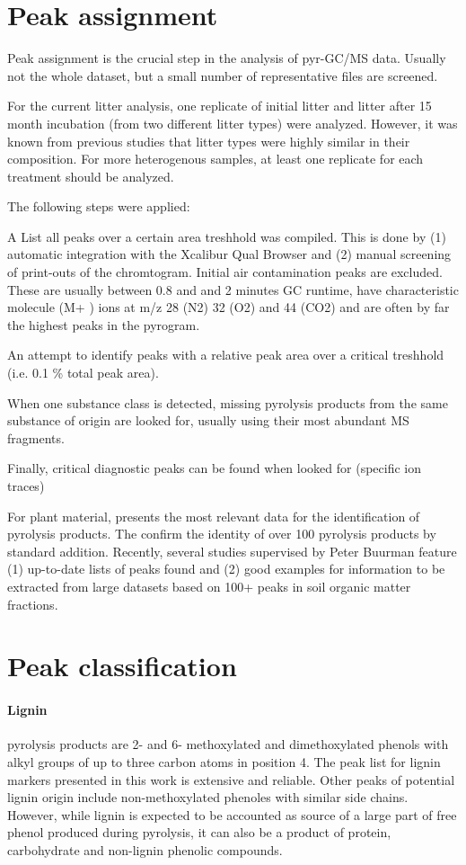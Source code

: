\section{Peak assignment}

Peak assignment is the crucial step in the analysis of pyr-GC/MS data. Usually not the whole dataset, but a small number of representative files are screened. 

For the current litter analysis, one replicate of initial litter and litter after 15 month incubation (from two different litter types) were analyzed. However, it was known from previous studies that litter types were highly similar in their composition. For more heterogenous samples, at least one replicate for each treatment should be analyzed. 

The following steps were applied:

A List all peaks over a certain area treshhold was compiled. This is done by (1) automatic integration with the Xcalibur Qual Browser and (2) manual screening of print-outs of the chromtogram. Initial air contamination peaks are excluded. These are usually between 0.8 and and 2 minutes GC runtime, have characteristic molecule (M+ ) ions at m/z 28 (N2) 32 (O2) and 44 (CO2) and are often by far the highest peaks in the pyrogram. 

An attempt to identify peaks with a relative peak area over a critical treshhold (i.e. 0.1 \% total peak area).

When one substance class is detected, missing pyrolysis products from the same substance of origin are looked for, usually using their most abundant MS fragments.

Finally, critical diagnostic peaks can be found when looked for (specific ion traces)

For plant material, \cite{Ralph1991} presents the most relevant data for the identification of pyrolysis products. The confirm the identity of over 100 pyrolysis products by standard addition. Recently, several studies supervised by Peter Buurman \citep{Schellekens2009,Buurman2010, Vancampenhout2009 } feature (1) up-to-date lists of peaks found and (2) good examples for information to be extracted from large datasets based on 100+ peaks in soil organic matter fractions.

\section{Peak classification}

\paragraph{Lignin} pyrolysis products are 2- and 6- methoxylated and dimethoxylated phenols with alkyl groups of up to three carbon atoms in position 4. The peak list for lignin markers presented in this work is extensive and reliable. Other peaks of potential lignin origin include non-methoxylated phenoles with similar side chains. However, while lignin is expected to be accounted as source of a large part of free phenol produced during pyrolysis, it can also be a product of protein, carbohydrate and non-lignin phenolic compounds.

